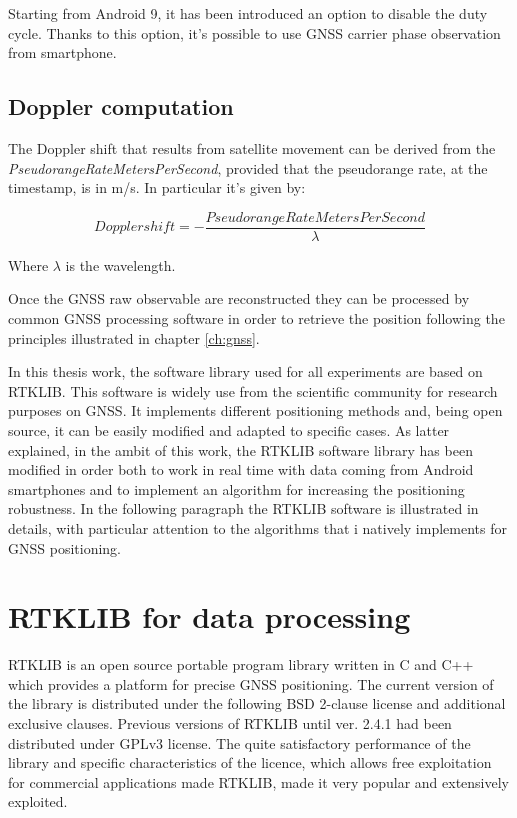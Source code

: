 Starting from Android 9, it has been introduced an option to disable the duty cycle. Thanks to this option, it's possible to use GNSS carrier phase observation from smartphone.

\subsection{Doppler computation}
 The Doppler shift that results from satellite movement can be derived from the \textit{PseudorangeRateMetersPerSecond}, provided
 that the pseudorange rate, at the timestamp, is in m/s. In particular it's given by:
 
 \begin{equation}
 	Dopplershift = -\frac{PseudorangeRateMetersPerSecond}{\lambda}  	\label{eq:doppler_and}
 \end{equation}

Where $\lambda$ is the wavelength.

Once the GNSS raw observable are reconstructed they can be processed by common GNSS processing software in order to retrieve the position following the principles illustrated in chapter \ref{ch:gnss}. 


In this thesis work, the software library used for all experiments are based on RTKLIB. This software is widely use from the scientific community for research purposes on GNSS.
It implements different positioning methods and, being open source, it can be easily modified and adapted to specific cases. As latter explained, in the ambit of this work, the RTKLIB software library has been modified in order both to work in real time with data coming from Android smartphones and to implement an algorithm for increasing the positioning robustness. In the following paragraph the RTKLIB software is illustrated in details, with particular attention to the algorithms that i natively implements for GNSS positioning.

\section{RTKLIB for data processing}
RTKLIB \cite{takasu:2009}  is an open source portable program library written in C and C++ which provides a platform for precise GNSS positioning. The current version of the library is distributed under the following BSD 2-clause license and additional exclusive clauses. Previous versions of RTKLIB until ver. 2.4.1 had been distributed under GPLv3 license.
The quite satisfactory performance of the library and  specific characteristics of the licence, which allows free exploitation for commercial applications made RTKLIB, made it very popular and extensively exploited. 
